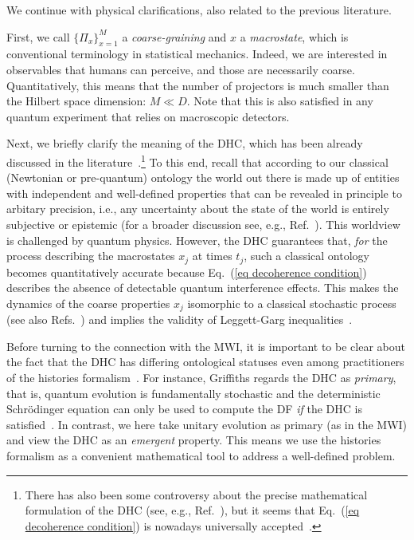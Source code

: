 \documentclass[pre,onecolumn,12pt,aps,longbibliography,nofootinbib]{revtex4-2}
\begin{document}
We continue with physical clarifications, also related to the previous literature.

First, we call $\{\Pi_x\}_{x=1}^M$ a \emph{coarse-graining} and $x$ a \emph{macrostate}, which is conventional terminology in statistical mechanics. Indeed, we are interested in observables that humans can perceive, and those are necessarily coarse. Quantitatively, this means that the number of projectors is much smaller than the Hilbert space dimension: $M\ll D$. Note that this is also satisfied in any quantum experiment that relies on macroscopic detectors.

Next, we briefly clarify the meaning of the DHC, which has been already discussed in the literature~\cite{GriffithsJSP1984, GellMannHartleInBook1990, OmnesRMP1992, DowkerHalliwellPRD1992, GellMannHartlePRD1993, HalliwellANY1995, DowkerKentJSP1996, GriffithsBook2002, GellMannHartlePRA2007, Griffiths2019}.\footnote{There has also been some controversy about the precise mathematical formulation of the DHC (see, e.g., Ref.~\cite{DiosiPRL2004}), but it seems that Eq.~(\ref{eq decoherence condition}) is nowadays universally accepted~\cite{Griffiths2019}. } To this end, recall that according to our classical (Newtonian or pre-quantum) ontology the world out there is made up of entities with independent and well-defined properties that can be revealed in principle to arbitary precision, i.e., any uncertainty about the state of the world is entirely subjective or epistemic (for a broader discussion see, e.g., Ref.~\cite{Barad2007}). This worldview is challenged by quantum physics. However, the DHC guarantees that, \emph{for} the process describing the macrostates $x_j$ at times $t_j$, such a classical ontology becomes quantitatively accurate because Eq.~(\ref{eq decoherence condition}) describes the absence of detectable quantum interference effects. This makes the dynamics of the coarse properties $x_j$ isomorphic to a classical stochastic process (see also Refs.~\cite{SmirneEtAlQST2018, StrasbergDiazPRA2019, MilzEtAlQuantum2020, MilzEtAlPRX2020, MilzModiPRXQ2021, StrasbergBook2022, StrasbergEtAlPRA2023, StrasbergSP2023, SzankowskiCywinskiArXiv2023}) and implies the validity of Leggett-Garg inequalities~\cite{EmaryLambertNoriRPP2014}.

Before turning to the connection with the MWI, it is important to be clear about the fact that the DHC has differing ontological statuses even among practitioners of the histories formalism~\cite{OmnesRMP1992, DowkerKentJSP1996}. For instance, Griffiths regards the DHC as \emph{primary}, that is, quantum evolution is fundamentally stochastic and the deterministic Schr\"odinger equation can only be used to compute the DF \emph{if} the DHC is satisfied~\cite{GriffithsJSP1984, GriffithsBook2002, Griffiths2019}. In contrast, we here take unitary evolution as primary (as in the MWI) and view the DHC as an \emph{emergent} property. This means we use the histories formalism as a convenient mathematical tool to address a well-defined problem.
\end{document}
